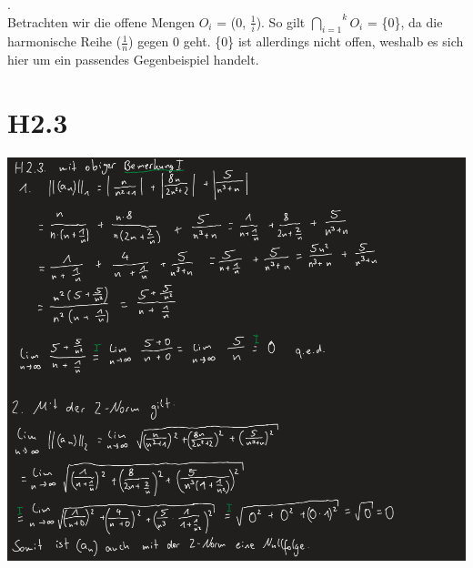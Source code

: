 \documentclass{article}
\begin{document}
\bigskip
{}. \\ 
Betrachten wir die offene Mengen $O_i$ = (0, $\frac{1}{i}$). So gilt $\overset{k}{\underset{i = 1}{\bigcap}} O_i$ = \{0\}, da die harmonische 
Reihe ($\frac{1}{n}$) gegen 0 geht. \{0\} ist allerdings nicht offen, weshalb es sich hier um ein passendes Gegenbeispiel handelt.

\section{H2.3}
\includegraphics[scale=0.6]{h2_3}
\end{document}
